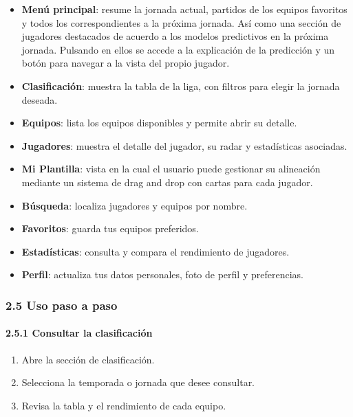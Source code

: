 \begin{itemize}
    \item \textbf{Menú principal}: resume la jornada actual, partidos de los equipos favoritos y todos los correspondientes a la próxima jornada. Así como una sección de jugadores destacados de acuerdo a los modelos predictivos en la próxima jornada. Pulsando en ellos se accede a la explicación de la predicción y un botón para navegar a la vista del propio jugador.
    
    \item \textbf{Clasificación}: muestra la tabla de la liga, con filtros para elegir la jornada deseada.
    
    \item \textbf{Equipos}: lista los equipos disponibles y permite abrir su detalle.
    
    \item \textbf{Jugadores}: muestra el detalle del jugador, su radar y estadísticas asociadas.
    
    \item \textbf{Mi Plantilla}: vista en la cual el usuario puede gestionar su alineación mediante un sistema de drag and drop con cartas para cada jugador.
    
    \item \textbf{Búsqueda}: localiza jugadores y equipos por nombre.
    
    \item \textbf{Favoritos}: guarda tus equipos preferidos.
    
    \item \textbf{Estadísticas}: consulta y compara el rendimiento de jugadores.
    
    \item \textbf{Perfil}: actualiza tus datos personales, foto de perfil y preferencias.
\end{itemize}

\subsubsection*{2.5 Uso paso a paso}

\paragraph*{2.5.1 Consultar la clasificación}

\begin{enumerate}
    \item Abre la sección de clasificación.
    \item Selecciona la temporada o jornada que desee consultar.
    \item Revisa la tabla y el rendimiento de cada equipo.
\end{enumerate}


